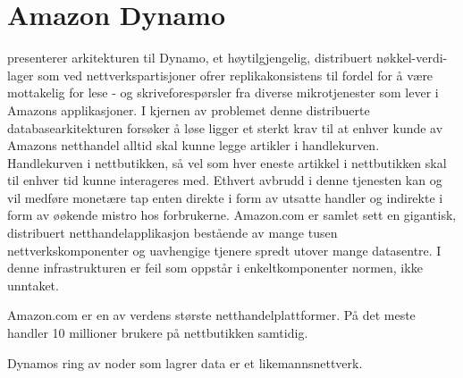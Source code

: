 \section{Amazon Dynamo}

\cite{decandia2007} presenterer arkitekturen til Dynamo, et høytilgjengelig, distribuert nøkkel-verdi-lager som ved nettverkspartisjoner ofrer replikakonsistens til fordel for å være mottakelig for lese - og skriveforespørsler fra diverse mikrotjenester som lever i Amazons applikasjoner. I kjernen av problemet denne distribuerte databasearkitekturen forsøker å løse ligger et sterkt krav til at enhver kunde av Amazons netthandel alltid skal kunne legge artikler i handlekurven. Handlekurven i nettbutikken, så vel som hver eneste artikkel i nettbutikken skal til enhver tid kunne interageres med. Ethvert avbrudd i denne tjenesten kan og vil medføre monetære tap enten direkte i form av utsatte handler og indirekte i form av øøkende mistro hos forbrukerne. Amazon.com er samlet sett en gigantisk, distribuert netthandelapplikasjon bestående av mange tusen nettverkskomponenter og uavhengige tjenere spredt utover mange datasentre. I denne infrastrukturen er feil som oppstår i enkeltkomponenter normen, ikke unntaket.

Amazon.com er en av verdens største netthandelplattformer. På det meste handler 10 millioner brukere på nettbutikken samtidig.


Dynamos ring av noder som lagrer data er et likemannsnettverk.

